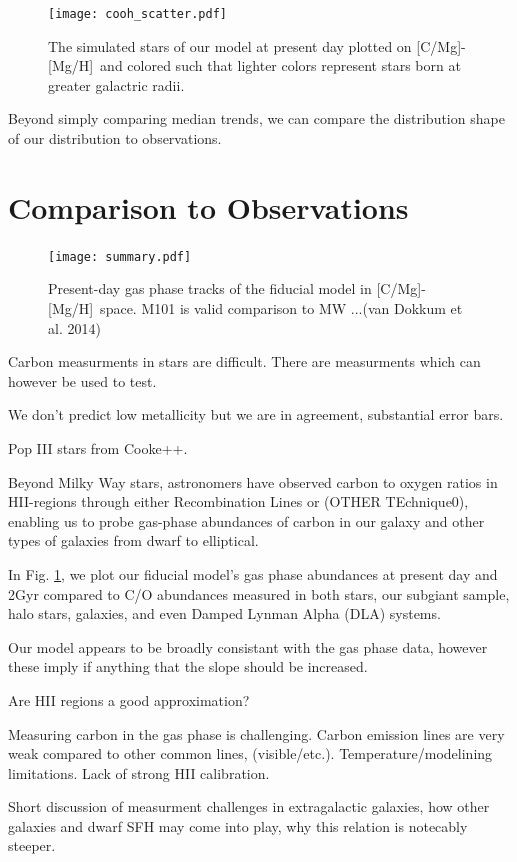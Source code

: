 \documentclass[12pt,oneside]{report}
\newcommand{\caah}{[C/Mg]-[Mg/H]}
\begin{document}
\begin{figure}
    \centering
    \texttt{[image: cooh\_scatter.pdf]}
    \caption[Scatter agreement]{The simulated stars of our model at present day plotted on \caah~and colored such that lighter colors represent stars born at greater galactric radii.}
\end{figure}

Beyond simply comparing median trends, we can compare the distribution 
shape of our distribution to observations. 

\section{Comparison to Observations}

\begin{figure}
\centering
\texttt{[image: summary.pdf]}
\caption[Gas phase abundances]{Present-day gas phase tracks of the fiducial model in \caah~space. M101 is valid comparison to MW ...(van Dokkum et al. 2014)}
\label{fig:gas_phase}
\end{figure}

Carbon measurments in stars are difficult. There are measurments which can however be used to test. 

We don't predict low metallicity but we are in agreement, substantial error bars.

Pop III stars from Cooke++. 

Beyond Milky Way stars, astronomers have observed carbon to oxygen ratios in
HII-regions through either Recombination Lines or (OTHER TEchnique0), enabling
us to probe gas-phase abundances of carbon in our galaxy and other types of
galaxies from dwarf to elliptical. 

In Fig. \ref{fig:gas_phase}, we plot our fiducial model's gas phase abundances
at present day and 2Gyr compared to C/O
abundances measured in both stars, our subgiant sample, halo stars, galaxies,
and even Damped Lynman Alpha (DLA) systems. 

Our model appears to be broadly consistant with the gas phase data, however these imply if anything that the slope should be increased. 

Are HII regions a good approximation?

Measuring carbon in the gas phase is challenging. Carbon emission lines are
very weak compared to other common lines, (visible/etc.).
Temperature/modelining limitations. Lack of strong HII calibration. 

Short discussion of measurment challenges in extragalactic galaxies, how other galaxies and dwarf SFH may come into play, why this relation is notecably steeper.
\end{document}
